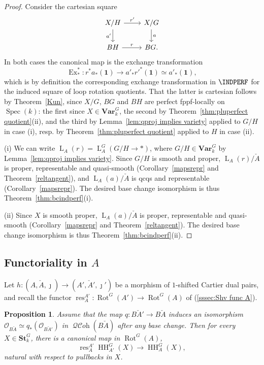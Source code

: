 \documentclass[12pt, oneside]{amsart}
\numberwithin{equation}{section}
\newtheorem{proposition}[subsubsection]{Proposition}
\theoremstyle{remark}
\theoremstyle{plain}
\DeclareMathOperator{\QCOH}{\mathcal{QC}\textit{oh}}
\newcommand{\Loop}{\operatorname{L}}
\newcommand{\OO}{\mathcal{O}}
\DeclareMathOperator{\spc}{Spec}
\newcommand{\Stk}{\mathbf{St}_{k}}
\newcommand{\Var}{\mathbf{Var}_{k}}
\newcommand{\HH}{\operatorname{HH}}
\newcommand{\Rot}{\operatorname{Rot}}
\newcommand{\un}{\mathbf{1}}
\begin{document}
\begin{proof}
Consider the cartesian square
$$\begin{tikzcd}
X/H\arrow{r}{r'} \arrow[swap]{d}{a'} & X/G\arrow{d}{a} \\
BH\arrow{r}{r} & BG.
\end{tikzcd}$$
In both cases the canonical map is the exchange transformation
\[
  \operatorname{Ex}^*_* : r^* a_*(\un) \to a'_* r'^*(\un) \simeq a'_*(\un),
\]
which is by definition the corresponding exchange transformation in $\INDPERF$ for the induced square of loop rotation quotients.
That the latter is cartesian follows by Theorem~\ref{Kun}, since $X/G$, $BG$ and $BH$ are perfect fppf-locally on $\spc(k)$: the first since $X \in \Var^G$, the second by Theorem~\ref{thm:pluperfect quotient}(ii), and the third by Lemma~\ref{lem:qproj implies variety} applied to $G/H$ in case (i), resp. by Theorem~\ref{thm:pluperfect quotient} applied to $H$ in case (ii).

(i) We can write $\Loop_A(r) = \Loop_A^G(G/H \to *)$, where $G/H \in \Var^G$ by Lemma~\ref{lem:qproj implies variety}.
Since $G/H$ is smooth and proper, $\Loop_A(r)/\check{A}$ is proper, representable and quasi-smooth (Corollary~\ref{mapsrepr} and Theorem~\ref{reltangent}), and $\Loop_A(a)/\check{A}$ is qcqs and representable (Corollary~\ref{mapsrepr}).
The desired base change isomorphism is thus Theorem~\ref{thm:bcindperf}(i).

(ii) Since $X$ is smooth proper, $\Loop_A(a)/\check{A}$ is proper, representable and quasi-smooth (Corollary~\ref{mapsrepr} and Theorem~\ref{reltangent}).
The desired base change isomorphism is thus Theorem~\ref{thm:bcindperf}(ii).
\end{proof}

\subsection{Functoriality in $A$}\label{ssec:HH func A}

Let $h : (A,\check{A},\jmath) \to (A',\check{A}',\jmath')$ be a morphism of $1$-shifted Cartier dual pairs, and recall the functor $\operatorname{res}_A^{A'} : \Rot^G(A') \to \Rot^G(A)$ of (\ref{sssec:Shv func A}).

\begin{proposition}\label{prop:HH func A}
  Assume that the map $q : B\check{A}' \to B\check{A}$ induces an isomorphism $\OO_{B\check{A}} \simeq q_*(\OO_{B\check{A}'})$ in $\QCOH(B\check{A})$ after any base change.
  Then for every $X \in \Stk^G$, there is a canonical map in $\Rot^G(A)$,
  \[
    \operatorname{res}_A^{A'} \HH_{A'}^G(X) \to \HH_{A}^G(X),
  \]
  natural with respect to pullbacks in $X$.
\end{proposition}
\end{document}
